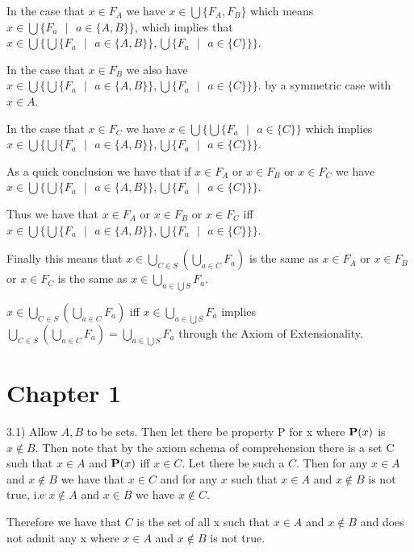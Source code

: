\documentclass{article}
\begin{document}
\medskip
In the case that $x \in F_A$ we have $x \in \bigcup\{F_A, F_B\}$ which means $x \in \bigcup\{F_a \text{ } | \text{ } a \in \{A,B\}\}$, which implies that $x \in \bigcup\{\bigcup\{F_a \text{ } | \text{ } a \in \{A,B\}\}, \bigcup\{F_    a \text{ } | \text{ } a \in \{C\}\}\}$.

\medskip
In the case that $x \in F_B$ we also have $x \in \bigcup\{\bigcup\{F_a \text{ } | \text{ } a \in \{A,B\}\}, \bigcup\{F_a \text{ } | \text{ } a \in \{C\}\}\}$. by a symmetric case with $x \in A$.

\medskip
In the case that $x \in F_C$ we have $x \in \bigcup\{\bigcup\{F_a \text{     } | \text{ } a \in \{C\}\}$ which implies $x \in \bigcup\{\bigcup\{F_a \text{ } | \text{ } a \in \{A,B\}\}, \bigcup\{F_a \text{ } | \text{ } a \in \{C\}\}\}$.

\medskip
As a quick conclusion we have that if $x \in F_A$ or $x \in F_B$ or $x \in F_C$ we have $x \in  \bigcup\{\bigcup\{F_a \text{ } | \text{ } a \in \{A,B\}\}, \bigcup\{F_a \text{ } | \text{ } a \in \{C\}\}\}$.

\medskip
Thus we have that $x \in F_A$ or $x \in F_B$ or $x \in F_C$ iff $x \in  \bigcup\{\bigcup\{F_a \text{ } | \text{ } a \in \{A,B\}\}, \bigcup\{F_a \text{ } | \text{ } a \in \{C\}\}\}$.

Finally this means that $x \in \bigcup_{C \in S}(\bigcup_{a \in C}F_a)$ is the same as $x \in F_A$ or $x \in F_B$ or $x \in F_C$ is the same as $x \in \bigcup_{a \in \bigcup S}F_a$.

\medskip
$x \in \bigcup_{C \in S}(\bigcup_{a \in C}F_a)$ iff $x \in \bigcup_{a \in \bigcup S}F_a$ implies $\bigcup_{C \in S}(\bigcup_{a \in C}F_a) = \bigcup_{a \in \bigcup S}F_a$ through the Axiom of Extensionality.


\section{Chapter 1}

3.1) 
Allow $A,B$ to be sets. Then let there be property P for x where $\bold{P}(x)$ is $x \notin B$. Then note that by the axiom schema of comprehension there is a set C such that $x \in A$ and $\bold{P}(x)$ iff $x \in C$. Let there be such a $C$. Then for any $x \in A$ and $x \notin B$ we have that $x \in C$ and for any $x$ such that $x \in A$ and $x \notin B$ is not true, i.e $x \notin A$ and $x \in B$ we have $x \notin C$. 

\medskip
Therefore we have that $C$ is the set of all x such that $x \in A$ and $x \notin B$ and does not admit any x where $x \in A$ and $x \notin B$ is not true.
\end{document}
